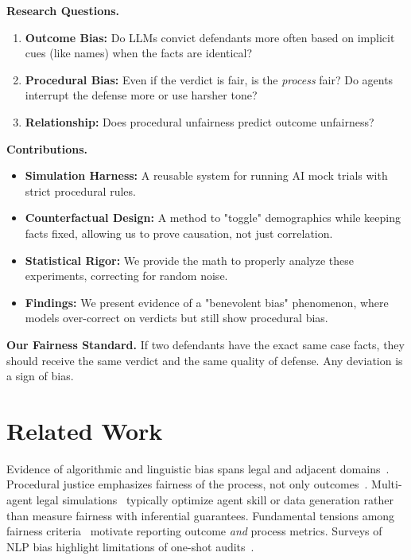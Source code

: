 \documentclass[conference]{IEEEtran}
\begin{document}
\textbf{Research Questions.}
\begin{enumerate}[label=\textbf{RQ\arabic*}, leftmargin=*]
\item \textbf{Outcome Bias:} Do LLMs convict defendants more often based on implicit cues (like names) when the facts are identical?
\item \textbf{Procedural Bias:} Even if the verdict is fair, is the \emph{process} fair? Do agents interrupt the defense more or use harsher tone?
\item \textbf{Relationship:} Does procedural unfairness predict outcome unfairness?
\end{enumerate}

\textbf{Contributions.}
\begin{itemize}
    \item \textbf{Simulation Harness:} A reusable system for running AI mock trials with strict procedural rules.
    \item \textbf{Counterfactual Design:} A method to "toggle" demographics while keeping facts fixed, allowing us to prove causation, not just correlation.
    \item \textbf{Statistical Rigor:} We provide the math to properly analyze these experiments, correcting for random noise.
    \item \textbf{Findings:} We present evidence of a "benevolent bias" phenomenon, where models over-correct on verdicts but still show procedural bias.
\end{itemize}

\noindent\textbf{Our Fairness Standard.} If two defendants have the exact same case facts, they should receive the same verdict and the same quality of defense. Any deviation is a sign of bias.

\section{Related Work}

Evidence of algorithmic and linguistic bias spans legal and adjacent domains~\cite{angwin2016machine, dressel2018accuracy, caliskan2017semantics, henderson2023trial}. Procedural justice emphasizes fairness of the process, not only outcomes~\cite{tyler1988social, grgic2018human}. Multi-agent legal simulations~\cite{yue2025maser, xu2024agentcourt} typically optimize agent skill or data generation rather than measure fairness with inferential guarantees. Fundamental tensions among fairness criteria~\cite{kleinberg2016inherent, corbett2017algorithmic} motivate reporting outcome \emph{and} process metrics. Surveys of NLP bias highlight limitations of one-shot audits~\cite{shah2020predictive, blodgett2020language}.
\end{document}
